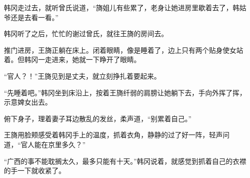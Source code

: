 韩冈走过去，就听曾氏说道，“旖姐儿有些累了，老身让她进房里歇着去了，韩姑爷还是去看一看。”

韩冈听了之后，忙忙的谢过曾氏，就往王旖的房间去。

推门进房，王旖正躺在床上。闭着眼睛，像是睡着了，边上只有两个贴身使女站着。但韩冈一走进来，她就一下睁开了眼睛。

“官人？！”王旖见到是丈夫，就立刻挣扎着要起来。

“先睡着吧。”韩冈坐到床沿上，按着王旖纤弱的肩膀让她躺下去，手向外挥了挥，示意婢女出去。

俯下身子，理着妻子耳边散乱的发丝，柔声道，“别累着自己。”

王旖用脸颊感受着韩冈手上的温度，抓着衣角，静静的过了好一阵，轻声问道，“官人能在京里多久？”

“广西的事不能耽搁太久，最多只能有十天。”韩冈说着，就感觉到抓着自己的衣襟的手一下就收紧了。


